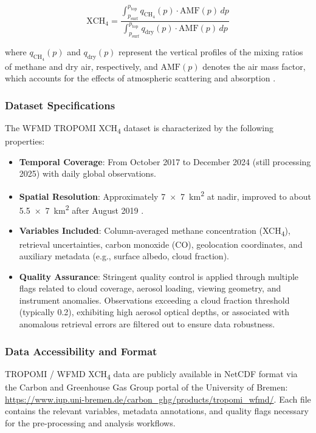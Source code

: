 \begin{equation}
	\mathrm{XCH}_4 = \frac{\int_{p_\mathrm{surf}}^{p_\mathrm{top}} q_{\mathrm{CH}_4}(p) \cdot \mathrm{AMF}(p) \, dp}{\int_{p_\mathrm{surf}}^{p_\mathrm{top}} q_{\mathrm{dry}}(p) \cdot \mathrm{AMF}(p) \, dp}
\end{equation}

where $q_{\mathrm{CH}_4}(p)$ and $q_{\mathrm{dry}}(p)$ represent the vertical profiles of the mixing ratios of methane and dry air, respectively, and $\mathrm{AMF}(p)$ denotes the air mass factor, which accounts for the effects of atmospheric scattering and absorption \cite{Schneising2019, Schneising2023}.

\subsubsection{Dataset Specifications}
The WFMD TROPOMI XCH\textsubscript{4} dataset is characterized by the following properties:

\begin{itemize}
	\item \textbf{Temporal Coverage}: From October 2017 to December 2024 (still processing 2025) with daily global observations.
	\item \textbf{Spatial Resolution}: Approximately 7~$\times$~7~km\textsuperscript{2} at nadir, improved to about 5.5~$\times$~7~km\textsuperscript{2} after August 2019 \cite{Schneising2023}.
	\item \textbf{Variables Included}: Column-averaged methane concentration (XCH\textsubscript{4}), retrieval uncertainties, carbon monoxide (CO), geolocation coordinates, and auxiliary metadata (e.g., surface albedo, cloud fraction).
	\item \textbf{Quality Assurance}: Stringent quality control is applied through multiple flags related to cloud coverage, aerosol loading, viewing geometry, and instrument anomalies. Observations exceeding a cloud fraction threshold (typically 0.2), exhibiting high aerosol optical depths, or associated with anomalous retrieval errors are filtered out to ensure data robustness.
\end{itemize}

\subsubsection{Data Accessibility and Format}
TROPOMI / WFMD XCH\textsubscript{4} data are publicly available in NetCDF format via the Carbon and Greenhouse Gas Group portal of the University of Bremen: \url{https://www.iup.uni-bremen.de/carbon_ghg/products/tropomi_wfmd/}. Each file contains the relevant variables, metadata annotations, and quality flags necessary for the pre-processing and analysis workflows.

